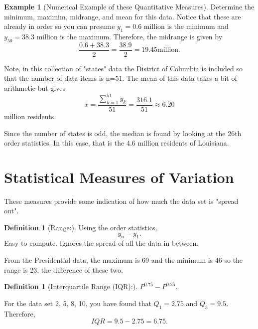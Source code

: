 \documentclass[10pt,]{book}
\theoremstyle{plain}
\theoremstyle{definition}
\newtheorem{definition}[theorem]{Definition}
\theoremstyle{definition}
\newtheorem{example}[theorem]{Example}
\theoremstyle{definition}
\numberwithin{equation}{section}
\begin{document}
\begin{example}[Numerical Example of these Quantitative Measures]
Determine the minimum, maximim, midrange, and mean for this data.
	Notice that these are already in order so you can presume 
		\(y_1 = 0.6\) million is the minimum and \(y_{50} = 38.3\) 
		million is the maximum. Therefore, the midrange is given by
		\begin{equation*}\frac{0.6+38.3}{2} = \frac{38.9}{2} = 19.45 \text{million}.\end{equation*}

		Note, in this collection of "states" data the District of Columbia is included so that the number of data items is n=51. The mean of this data takes a bit of arithmetic but gives
		\begin{equation*}\overline{x} = \frac{\sum_{k=1}^{51} y_k }{51} = \frac{316.1}{51} \approx 6.20\end{equation*}
		million residents. 
\par

		Since the number of states is odd, the median is found by looking at the 26th order statistics. In this case, that is the 4.6 million residents of Louisiana.


%
\end{example}
\typeout{************************************************}
\typeout{************************************************}
\section[{Statistical Measures of Variation}]{Statistical Measures of Variation}\label{section-5}
These measures provide some indication of how much the data set is "spread out".
%
\begin{definition}[{Range:}]\label{definition-10}
Using the order statistics, \begin{equation*}y_n - y_1.\end{equation*}  
Easy to compute. Ignores the spread of all the data in between.
%
\end{definition}
\par
From the Presidential data, the maximum is 69 and the minimum is 46 so the range is 23, the difference of these two. %
\begin{definition}[{Interquartile Range (IQR):}]\label{definition-11}
\(P^{0.75} - P^{0.25}\). 
%
\end{definition}
\par

For the data set {2, 5, 8, 10}, you have found that \(Q_1 = 2.75\) and \(Q_3 = 9.5\). Therefore, \begin{equation*}IQR = 9.5 - 2.75 = 6.75.\end{equation*}
%
\par
\end{document}
